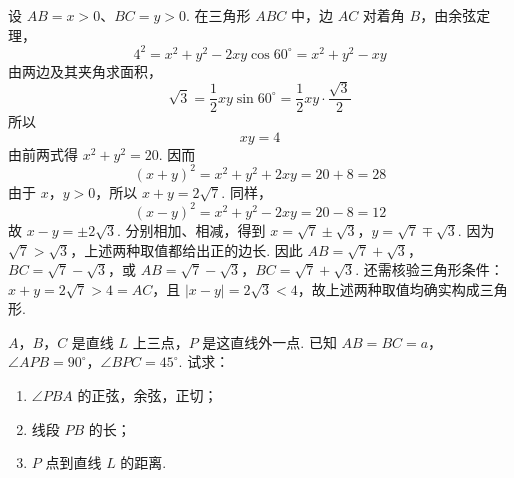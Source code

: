 \documentclass[UTF8,a4paper,oneside,11pt]{ctexbook}
\begin{document}
\begin{solution}
设 \(AB=x>0\)、\(BC=y>0\). 在三角形 \(ABC\) 中，边 \(AC\) 对着角 \(B\)，由余弦定理，
\[
4^2=x^2+y^2-2xy\cos60^\circ=x^2+y^2-xy
\]
由两边及其夹角求面积，
\[
\sqrt3=\frac12xy\sin60^\circ=\frac12xy\cdot\frac{\sqrt3}{2}
\]
所以
\[
xy=4
\]
由前两式得 \(x^2+y^2=20\). 因而
\[
(x+y)^2=x^2+y^2+2xy=20+8=28
\]
由于 \(x\)，\(y>0\)，所以 \(x+y=2\sqrt7\). 同样，
\[
(x-y)^2=x^2+y^2-2xy=20-8=12
\]
故 \(x-y=\pm2\sqrt3\). 分别相加、相减，得到 \(x=\sqrt7\pm\sqrt3\)，\(y=\sqrt7\mp\sqrt3\).
因为 \(\sqrt7>\sqrt3\)，上述两种取值都给出正的边长. 因此 \(AB=\sqrt7+\sqrt3\)，\(BC=\sqrt7-\sqrt3\)，或 \(AB=\sqrt7-\sqrt3\)，\(BC=\sqrt7+\sqrt3\). 还需核验三角形条件：\(x+y=2\sqrt7>4=AC\)，且 \(\left\lvert x-y\right\rvert=2\sqrt3<4\)，故上述两种取值均确实构成三角形.
\end{solution}

\begin{problem}
\(A\)，\(B\)，\(C\) 是直线 \(L\) 上三点，\(P\) 是这直线外一点. 已知 \(AB=BC=a\)，\(\angle APB=90^\circ\)，\(\angle BPC=45^\circ\). 试求：

\begin{enumerate}
\item \(\angle PBA\) 的正弦，余弦，正切；
\item 线段 \(PB\) 的长；
\item \(P\) 点到直线 \(L\) 的距离.
\end{enumerate}
\end{problem}
\end{document}
